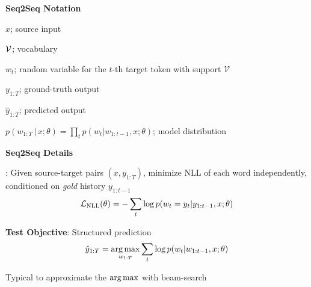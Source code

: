 \documentclass{beamer}
\let\tempone\itemize
\let\temptwo\enditemize
\renewenvironment{itemize}{\tempone\addtolength{\itemsep}{0.5\baselineskip}}{\temptwo}
\newcommand{\air}{\vspace{0.25cm}}
\newcommand{\given}{\,|\,}
\newcommand{\mcV}{\mathcal{V}}
\def\argmax{\operatornamewithlimits{arg\,max}}
\def\argmax{\operatornamewithlimits{arg\,max}}
\begin{document}
\begin{frame}
  \centerline{\textbf{Seq2Seq Notation}}
 
  \begin{itemize}
  \item $x$; source input 
  \item $\cal V$; vocabulary
  \item $w_t$; random variable for the $t$-th target token with support $\mcV$ 
  \item $y_{1:T}$; ground-truth output 
  \item $\hat{y}_{1:T}$; predicted output 
  \item  $p(w_{1:T} \given x ;\theta)= \prod_{t} p(w_t | w_{1:t-1}, x; \theta)$; model distribution \
  \end{itemize}
\end{frame}


\begin{frame}
  \centerline{\textbf{Seq2Seq Details}}
  \textbf{}: Given source-target pairs $(x, y_{1:T})$, minimize NLL of each word independently, conditioned on \textit{gold} history $y_{1:t-1}$
\begin{align*}
{\cal L}_{\text{NLL}}(\theta) = -\sum_{t} \log p(w_{t} = y_t | y_{1:t-1}, x; \theta) 
\end{align*}

  \air

\textbf{\alert{Test Objective}}:  Structured prediction
  \begin{align*}
  \hat{y}_{1:T} = \argmax_{w_{1:T}} \sum_{t} \log p(w_{t} | w_{1:t-1}, x; \theta)
\end{align*}
\begin{itemize}
\item Typical to approximate the $\argmax$ with beam-search
\end{itemize}
\end{frame}
\end{document}
